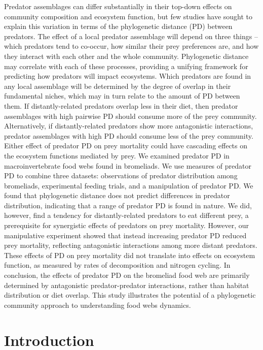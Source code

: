 \documentclass[11pt]{article}
\begin{document}
Predator assemblages can differ substantially in their top-down effects on
community composition and ecosystem function, but few studies have sought to
explain this variation in terms of the phylogenetic distance (PD) between
predators. The effect of a local predator assemblage will depend on three things -- which predators tend to co-occur, how similar their prey preferences are, and how they interact with each other and the whole community. Phylogenetic distance may correlate with each of these processes, providing a unifying framework for predicting how predators will impact ecosystems. Which predators are found in any local assemblage will be determined by the degree of overlap in their fundamental niches, which may in turn relate to the amount of PD between them. If 
distantly-related predators overlap less in their diet, then predator
assemblages with high pairwise PD should consume more of the prey community.
Alternatively, if distantly-related predators show more antagonistic
interactions, predator assemblages with high PD should consume less of the
prey community. Either effect of predator PD on prey mortality could have
cascading effects on the ecosystem functions mediated by prey. We examined
predator PD in macroinvertebrate food webs found in bromeliads. We use measures of predator PD to combine three datasets:
observations of predator distribution among bromeliads, experimental feeding
trials, and a manipulation of predator PD. We found that phylogenetic distance
does not predict differences in predator distribution, indicating that a range
of predator PD is found in nature. We did, however, find a tendency for
distantly-related predators to eat different prey, a prerequisite for
synergistic effects of predators on prey mortality. However, our manipulative
experiment showed that instead increasing predator PD reduced prey mortality,
reflecting antagonistic interactions among more distant predators. These
effects of PD on prey mortality did not translate into effects on ecosystem
function, as measured by rates of decomposition and nitrogen cycling. In
conclusion, the effects of predator PD on the bromeliad food web are primarily
determined by antagonistic predator-predator interactions, rather than habitat
distribution or diet overlap. This study illustrates the potential of a
phylogenetic community approach to understanding food webs dynamics.


\newpage{}

\section*{Introduction}
\end{document}
